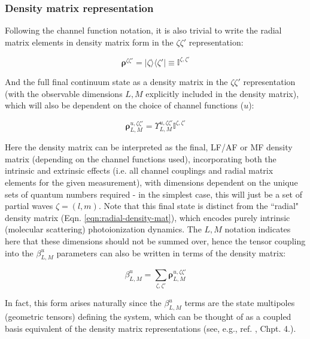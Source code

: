 \subsubsection{Density matrix representation}
Following the channel function notation, it is also trivial to write the radial matrix elements in density matrix form in the $\zeta\zeta'$ representation:

\begin{equation}
\mathbf{\rho}^{\zeta\zeta'} = |\zeta\rangle\langle\zeta'| \equiv \mathbb{I}^{\zeta,\zeta'}\label{eqn:radial-density-mat}
\end{equation}

And the full final continuum state as a density matrix in the $\zeta\zeta'$ representation (with the observable dimensions $L,M$ explicitly included in the density matrix), which will also be dependent on the choice of channel functions ($u$):

\begin{equation}
\mathbf{\rho}_{L,M}^{u,\zeta\zeta'}=\varUpsilon_{L,M}^{u,\zeta\zeta'}\mathbb{I}^{\zeta,\zeta'}
\end{equation}

Here the density matrix can be interpreted as the final, LF/AF or
MF density matrix (depending on the channel functions used), incorporating both the intrinsic and extrinsic
effects (i.e. all channel couplings and radial matrix elements for
the given measurement), with dimensions dependent on the unique sets of quantum numbers required - in the simplest case, this will just be a set of partial waves $\zeta = (l,m)$. Note that this final state is distinct from the ``radial" density matrix (Eqn. \ref{eqn:radial-density-mat}), which encodes purely intrinsic (molecular scattering) photoionization dynamics. The $L,M$ notation indicates here that these dimensions should not be summed over, hence the tensor coupling into the $\beta_{L,M}^{u}$ parameters can also be written in terms of the density matrix:

\begin{equation}
\beta_{L,M}^{u}=\sum_{\zeta,\zeta'}\mathbf{\rho}_{L,M}^{u,\zeta\zeta'}
\end{equation}

In fact, this form arises naturally since the $\beta_{L,M}^{u}$ terms are the state multipoles (geometric tensors) defining the system, which can be thought of as a coupled basis equivalent of the density matrix representations (see, e.g., ref. \cite{BlumDensityMat}, Chpt. 4.).

